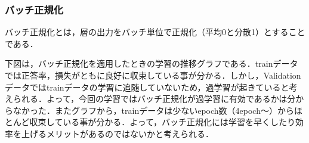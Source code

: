 \documentclass[uplatex,titlepage]{jsarticle}
\newif\iffigure
\begin{document}
\subsubsection{バッチ正規化}
バッチ正規化とは，層の出力をバッチ単位で正規化（平均0と分散1）とすることである．
\iffigure
\begin{figure}[H]%
    \begin{center}
    \texttt{[image: regular\_model.png]} 
    \caption{バッチ正規化のモデル}
    \end{center}
\end{figure}
\fi
下図は，バッチ正規化を適用したときの学習の推移グラフである．trainデータでは正答率，損失がともに良好に収束している事が分かる．しかし，Validationデータではtrainデータの学習に追随していないため，過学習が起きていると考えられる．よって，今回の学習ではバッチ正規化が過学習に有効であるかは分からなかった．またグラフから，trainデータは少ないepoch数（4epoch～）からほとんど収束している事が分かる．よって，バッチ正規化には学習を早くしたり効率を上げるメリットがあるのではないかと考えられる．
\iffigure
\begin{figure}[H]
\begin{minipage}{8cm}%
  \begin{center}
   \texttt{[image: regular\_acc.png]} \\
   \caption{バッチ正規化したときの正答率の推移}
  \end{center}
\end{minipage}
\hfill
\begin{minipage}{8cm}%
  \begin{center}
    \texttt{[image: regular\_loss.png]} \\
    \caption{バッチ正規化したときの損失の推移}
  \end{center}
\end{minipage}
\end{figure}
\fi
\end{document}
